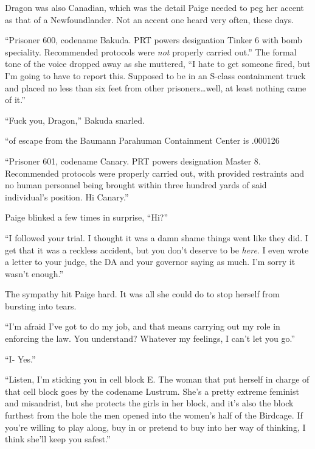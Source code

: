 Dragon was also Canadian, which was the detail Paige needed to peg her accent as that of a Newfoundlander.  Not an accent one heard very often, these days.



``Prisoner 600, codename Bakuda.  PRT powers designation Tinker 6 with bomb speciality.  Recommended protocols were \emph{not} properly carried out.''  The formal tone of the voice dropped away as she muttered, ``I hate to get someone fired, but I'm going to have to report this.  Supposed to be in an S-class containment truck and placed no less than six feet from other prisoners\ldots well, at least nothing came of it.''



``Fuck you, Dragon,'' Bakuda snarled.



``\ldotsChance of escape from the Baumann Parahuman Containment Center is .000126%



``Prisoner 601, codename Canary.  PRT powers designation Master 8.  Recommended protocols were properly carried out, with provided restraints and no human personnel being brought within three hundred yards of said individual's position.  Hi Canary.''



Paige blinked a few times in surprise, ``Hi?''



``I followed your trial.  I thought it was a damn shame things went like they did.  I get that it was a reckless accident, but you don't deserve to be \emph{here}.  I even wrote a letter to your judge, the DA and your governor saying as much.  I'm sorry it wasn't enough.''



The sympathy hit Paige hard.  It was all she could do to stop herself from bursting into tears.



``I'm afraid I've got to do my job, and that means carrying out my role in enforcing the law.  You understand?  Whatever my feelings, I can't let you go.''



``I- Yes.''



``Listen, I'm sticking you in cell block E.  The woman that put herself in charge of that cell block goes by the codename Lustrum.  She's a pretty extreme feminist and misandrist, but she protects the girls in her block, and it's also the block furthest from the hole the men opened into the women's half of the Birdcage.  If you're willing to play along, buy in or pretend to buy into her way of thinking, I think she'll keep you safest.''



